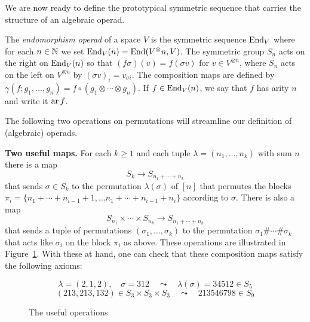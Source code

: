 We are now ready to define the prototypical symmetric
 sequence that carries the structure of an algebraic 
 operad. 
 
\begin{definition}
The \emph{endomorphism operad} of a space $V$ is the symmetric sequence $\operatorname{End}_V$
where for each $n\in\mathbb N$ we set $\operatorname{End}_V(n) = \operatorname{End}(V^\otimes n, V)$. 
The symmetric group $S_n$ acts on the right
on $\operatorname{End}_V(n)$ 
so that $(f\sigma)(v) = f(\sigma v)$ for
$v\in V^{\otimes n}$, where $S_n$ acts on
the left on $V^{\otimes n}$ by $(\sigma v)_i
= v_{\sigma i}$. The composition maps are defined
by $\gamma(f;g_1,\ldots,g_n) = f\circ (g_1\otimes\cdots \otimes g_n)$. 
If $f\in\operatorname{End}_V(n)$, we say that $f$ has arity $n$ and write
it $\operatorname{ar}{f}$.
\end{definition}


The following two operations on permutations 
will streamline our definition of (algebraic)
operads.

\medskip

\textbf{Two useful maps.} For each $k\geqslant 1$
and each tuple $\lambda = (n_1,\ldots,n_k)$ 
with sum $n$
there is a map
\[ S_k \longrightarrow S_{n_1+\cdots+n_k} \]
that sends $\sigma\in S_k$ to the permutation
$\lambda(\sigma)$ of $[n]$ that permutes the blocks 
$\pi_i = \{n_1+\cdots+n_{i-1}+1,\ldots
			n_1+\cdots+n_{i-1}+n_i\}$
			according to $\sigma$.
There is also a map
\[S_{n_1}\times \cdots \times  S_{n_k} 
	\longrightarrow S_{n_1+\cdots+n_k}  \] 
	that sends a tuple of permutations 
	$(\sigma_1,\ldots,\sigma_k)$ to the
	permutation $\sigma_1\#\cdots \# \sigma_k$
	that acts like $\sigma_i$ on the block $\pi_i$
	as above. These operations are illustrated
	in Figure~\ref{fig:1}. With these at hand, 
one can check that these composition maps
satisfy the following axioms:

\begin{figure}
$$\lambda = (2,1,2), \quad \sigma = 312
	\quad \leadsto \quad \lambda(\sigma) =  34512 \in S_5
	$$
	$$
	(213,213,132)\in S_3\times S_3\times S_3 \quad \leadsto \quad 213546798\in S_9 $$
\caption{The useful operations}
\label{fig:1}
\end{figure}

